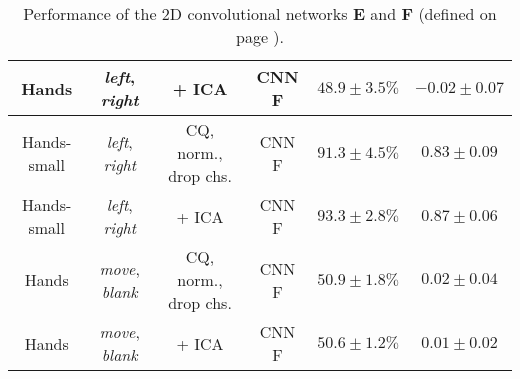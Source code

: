 \begin{table}[h]
{\begin{tabular}{c|c|c|c|c|c}
    \hline
    Hands                   & \textit{left}, \textit{right}                 & + ICA                     & CNN F                 &  $48.9 \pm 3.5\%$ & $-0.02 \pm 0.07$\\
    \hline
    Hands-small             & \textit{left}, \textit{right}                 & CQ, norm., drop chs.      & CNN F                 &  $91.3 \pm 4.5\%$ & $0.83 \pm 0.09$\\
    \hline
    Hands-small             & \textit{left}, \textit{right}                 & + ICA                     & CNN F                 &  $93.3 \pm 2.8\%$ & $0.87 \pm 0.06$\\
    \hline
    Hands                   & \textit{move}, \textit{blank}                 & CQ, norm., drop chs.      & CNN F                 &  $50.9 \pm 1.8\%$ &  $0.02 \pm 0.04$\\
    \hline
    Hands                   & \textit{move}, \textit{blank}                 & + ICA                     & CNN F                 &  $50.6 \pm 1.2\%$ &  $0.01 \pm 0.02$\\
    \hline
\end{tabular}
}
\caption{Performance of the 2D convolutional networks \textbf{E} and \textbf{F} (defined on page \pageref{itemize:2dCNNs}).}
\label{tab:hands-2dcnn-app}
\end{table}